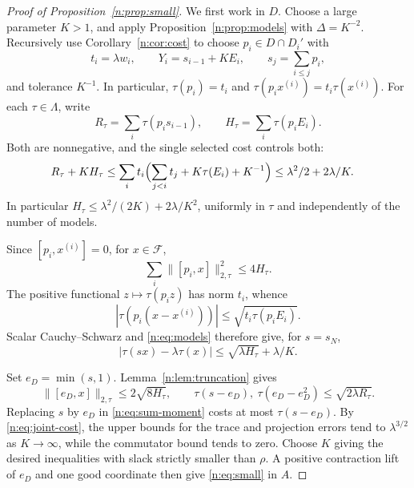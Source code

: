 \begin{proof}[Proof of Proposition~\ref{n:prop:small}]
We first work in $D$. Choose a large parameter $K>1$, and apply
Proposition~\ref{n:prop:models} with $\Delta=K^{-2}$. Recursively use
Corollary~\ref{n:cor:cost} to choose $p_i\in D\cap D_i'$ with
\[
 t_i=\lambda w_i,\qquad Y_i=s_{i-1}+KE_i,\qquad
 s_j=\sum_{i\le j}p_i,
\]
and tolerance $K^{-1}$. In particular,
$\tau(p_i)=t_i$ and $\tau(p_ix^{(i)})=t_i\tau(x^{(i)})$.
For each $\tau\in \Lambda$, write
\[
 R_\tau=\sum_i\tau(p_is_{i-1}),\qquad
 H_\tau=\sum_i\tau(p_iE_i).
\]
Both are nonnegative, and the single selected cost controls both:
\begin{align}
 R_\tau+KH_\tau
 &\le\sum_it_i\Bigl(\sum_{j<i}t_j+K\tau(E_i)+K^{-1}\Bigr)
 \le\lambda^2/2+2\lambda/K.\label{n:eq:joint-cost}
\end{align}
In particular $H_\tau\le\lambda^2/(2K)+2\lambda/K^2$, uniformly in
$\tau$ and independently of the number of models.

Since $[p_i,x^{(i)}]=0$, for $x\in\mathcal F$,
\[
 \sum_i\|[p_i,x]\|_{2,\tau}^2\le4H_\tau.
\]
The positive functional $z\mapsto\tau(p_i z)$ has norm $t_i$, whence
\[
 |\tau(p_i(x-x^{(i)}))|\le\sqrt{t_i\tau(p_iE_i)}.
\]
Scalar Cauchy--Schwarz and \eqref{n:eq:models} therefore give, for $s=s_N$,
\begin{equation}\label{n:eq:sum-moment}
 |\tau(sx)-\lambda\tau(x)|\le\sqrt{\lambda H_\tau}+\lambda/K.
\end{equation}

Set $e_D=\min(s,1)$. Lemma~\ref{n:lem:truncation} gives
\[
 \|[e_D,x]\|_{2,\tau}\le2\sqrt{8H_\tau},\qquad
 \tau(s-e_D),\ \tau(e_D-e_D^2)\le\sqrt{2\lambda R_\tau}.
\]
Replacing $s$ by $e_D$ in \eqref{n:eq:sum-moment} costs at most
$\tau(s-e_D)$. By \eqref{n:eq:joint-cost}, the upper bounds for the trace and projection errors
tend to $\lambda^{3/2}$ as $K\to\infty$, while the commutator bound
tends to zero. Choose $K$ giving the desired inequalities with slack
strictly smaller than $\rho$. A positive contraction lift of $e_D$ and
one good coordinate then give \eqref{n:eq:small} in $A$.
\end{proof}
